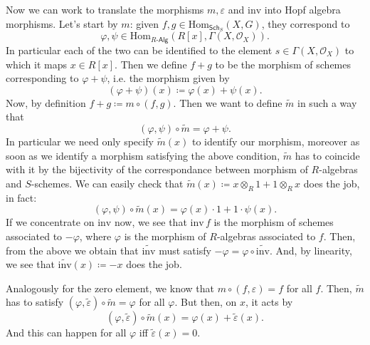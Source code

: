 \documentclass[../Main]{subfiles}
\begin{document}
\begin{ex}
\begin{enumerate}
			Now we can work to translate the morphisms $m, \varepsilon$ and $\mathrm{inv}$
			into Hopf algebra morphisms.
			Let's start by $m$:
			given $f,g \in \mathrm{Hom}_{\mathsf{Sch}_S} \left( X, G \right)$,
			they correspond to 
			\begin{equation}
			\varphi, \psi \in
			\mathrm{Hom}_{R \text{-}\mathsf{Alg}} 
			\left( R[x], \Gamma \left( X , \mathcal{O}_{ X } \right) \right)
			.\end{equation} 
			In particular each of the two can be identified to the element 
			$s \in \Gamma \left( X , \mathcal{O}_{ X } \right)$ to which
			it maps $x \in R[x]$.
			Then we define $f + g$ to be the morphism of schemes corresponding
			to $\varphi + \psi$, i.e. the morphism given by 
			\begin{equation}
				\left( \varphi + \psi \right)(x) \coloneqq
				\varphi (x) + \psi(x)
			.\end{equation} 
			Now, by definition $f + g \coloneqq m \circ (f,g)$.
			Then we want to define $\widetilde{m}$ in such a way that
			\begin{equation}
			(\varphi, \psi) \circ \widetilde{m} = \varphi + \psi
			.\end{equation} 
			In particular we need only specify $\widetilde{m}(x)$ to identify our morphism,
			moreover as soon as we identify a morphism satisfying the above condition,
			$\widetilde{m}$ has to coincide with it by the bijectivity of the correspondance
			between morphism of $R$-algebras and $S$-schemes.
			We can easily check that $\widetilde{m}(x) \coloneqq x \otimes_R 1 + 1 \otimes_R x$
			does the job, in fact:
			\begin{equation}
				(\varphi, \psi) \circ \widetilde{m} (x) =
				\varphi(x) \cdot 1 + 1 \cdot \psi(x)
			.\end{equation} 
			If we concentrate on $\mathrm{inv}$ now, we see that
			$\mathrm{inv}\, f$ is the morphism of schemes associated to
			$-\varphi$, where $\varphi$ is the morphism of $R$-algebras associated
			to $f$.
			Then, from the above we obtain that $\widetilde{\mathrm{inv}}$
			must satisfy $-\varphi = \varphi \circ \widetilde{\mathrm{inv}}$.
			And, by linearity, we see that $\widetilde{\mathrm{inv}}(x) \coloneqq -x$ does the job.

			Analogously for the zero element, we know that $m \circ (f, \varepsilon) = f$
			for all $f$.
			Then, $\widetilde{m}$ has to satisfy $(\varphi, \widetilde{\varepsilon}) \circ
			\widetilde{m} = \varphi$ for all $\varphi$.
			But then, on $x$, it acts by
			\begin{equation}
				(\varphi, \widetilde{\varepsilon}) \circ \widetilde{m} (x) =
				\varphi(x) + \widetilde{\varepsilon}(x)
			.\end{equation} 
			And this can happen for all $\varphi$ iff $\widetilde{\varepsilon}(x) = 0$.


\end{enumerate}
\end{ex}
\end{document}
